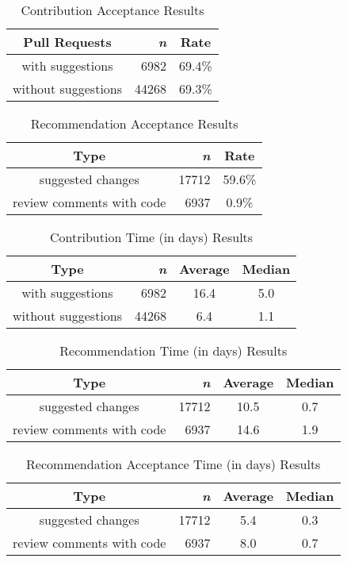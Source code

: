  \begin{table}[H]
\centering
\caption{Contribution Acceptance Results}
\begin{tabular}{ |c|r|c| } \hline
  \textbf{Pull Requests} & \textbf{\textit{n}} & \textbf{Rate} \\ \hline
 with suggestions & 6982 & 69.4\%\\ \hline 
 without suggestions & 44268 & 69.3\%\\ \hline
\end{tabular}
\label{tab:sugg-cont-accept}
\end{table}

\begin{table}[H]
\centering
\caption{Recommendation Acceptance Results}
\begin{tabular}{ |c|r|c|} \hline
   \textbf{Type} & \textbf{\textit{n}} & \textbf{Rate} \\ \hline
  suggested changes & 17712 & 59.6\% \\ \hline 
 review comments with code & 6937 & 0.9\% \\ \hline
\end{tabular}
\label{tab:sugg-rec-accept}
\end{table}

\begin{table}[H]
\centering
\caption{Contribution Time (in days) Results}
\begin{tabular}{ |c|r|c|c|} \hline
   \textbf{Type} & \textbf{\textit{n}} & \textbf{Average} & \textbf{Median} \\ \hline
  with suggestions & 6982 & 16.4 & 5.0  \\ \hline 
  without suggestions & 44268 & 6.4 & 1.1 \\ \hline
\end{tabular}
\label{tab:sugg-cont-time}
\end{table}

\begin{table}[H]
\centering
\caption{Recommendation Time (in days) Results}
\begin{tabular}{ |c|r|c|c|} \hline
   \textbf{Type} & \textbf{\textit{n}} & \textbf{Average} & \textbf{Median} \\ \hline
  suggested changes & 17712 & 10.5 & 0.7 \\ \hline 
  review comments with code & 6937 & 14.6 & 1.9 \\ \hline
\end{tabular}
\label{tab:sugg-rec-time}
\end{table}

\begin{table}[H]
\centering
\caption{Recommendation Acceptance Time (in days) Results}
\begin{tabular}{ |c|r|c|c|} \hline
   \textbf{Type} & \textbf{\textit{n}} & \textbf{Average} & \textbf{Median} \\ \hline
  suggested changes & 17712 & 5.4 &  0.3 \\ \hline 
 review comments with code & 6937 & 8.0 & 0.7 \\ \hline
\end{tabular}
\label{tab:sugg-rec-accept-time}
\end{table}
